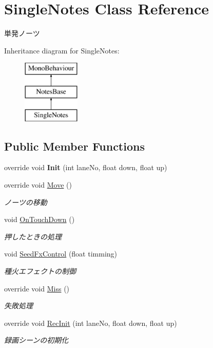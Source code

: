 \hypertarget{class_single_notes}{}\section{Single\+Notes Class Reference}
\label{class_single_notes}


単発ノーツ  


Inheritance diagram for Single\+Notes\+:\begin{figure}[H]
\begin{center}
\leavevmode
\includegraphics[height=3.000000cm]{class_single_notes}
\end{center}
\end{figure}
\subsection*{Public Member Functions}
\begin{DoxyCompactItemize}
\item 
override void {\bfseries Init} (int lane\+No, float down, float up)\hypertarget{class_single_notes_a06743f4372325fb1445d62eadc690446}{}\label{class_single_notes_a06743f4372325fb1445d62eadc690446}

\item 
override void \hyperlink{class_single_notes_ad845bd14668226c2edab7cc3aff1c575}{Move} ()
\begin{DoxyCompactList}\small\item\em ノーツの移動 \end{DoxyCompactList}\item 
void \hyperlink{class_single_notes_ac73c660a04161571760a41461ea7cf8b}{On\+Touch\+Down} ()
\begin{DoxyCompactList}\small\item\em 押したときの処理 \end{DoxyCompactList}\item 
void \hyperlink{class_single_notes_a1ac048470c51a39aae1aa48e1c2ab7fb}{Seed\+Fx\+Control} (float timming)
\begin{DoxyCompactList}\small\item\em 種火エフェクトの制御 \end{DoxyCompactList}\item 
override void \hyperlink{class_single_notes_a0ad7fbf218ce275691c094c42bda1103}{Miss} ()
\begin{DoxyCompactList}\small\item\em 失敗処理 \end{DoxyCompactList}\item 
override void \hyperlink{class_single_notes_a5e0ca4a12debb4cf39b7e4e24e0e0f7b}{Rec\+Init} (int lane\+No, float down, float up)
\begin{DoxyCompactList}\small\item\em 録画シーンの初期化 \end{DoxyCompactList}\end{DoxyCompactItemize}
